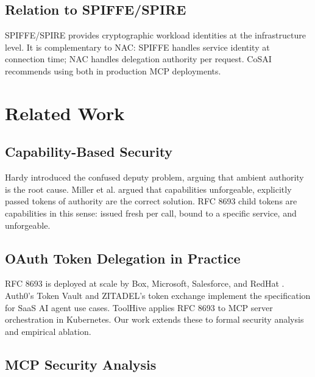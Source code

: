 \documentclass[journal]{IEEEtran}
\begin{document}
\subsection{Relation to SPIFFE/SPIRE}

SPIFFE/SPIRE \cite{spiffe} provides cryptographic workload identities at the
infrastructure level. It is complementary to NAC: SPIFFE handles service
identity at connection time; NAC handles delegation authority per request. CoSAI
\cite{cosai_mcp} recommends using both in production MCP deployments.


\FloatBarrier  %

\section{Related Work}
\label{sec:related}

\subsection{Capability-Based Security}

Hardy \cite{hardy1988} introduced the confused deputy problem, arguing that
ambient authority is the root cause. Miller et al. \cite{miller2003} argued that
capabilities unforgeable, explicitly passed tokens of authority are the
correct solution. RFC 8693 child tokens are capabilities in this sense: issued
fresh per call, bound to a specific service, and unforgeable.

\subsection{OAuth Token Delegation in Practice}

RFC 8693 \cite{rfc8693} is deployed at scale by Box, Microsoft, Salesforce, and
RedHat \cite{rfc8693_deploy}. Auth0's Token Vault \cite{auth0_token_vault} and
ZITADEL's token exchange \cite{zitadel_te} implement the specification for SaaS
AI agent use cases. ToolHive \cite{toolhive} applies RFC 8693 to MCP server
orchestration in Kubernetes. Our work extends these to formal security analysis
and empirical ablation.

\subsection{MCP Security Analysis}
\end{document}
